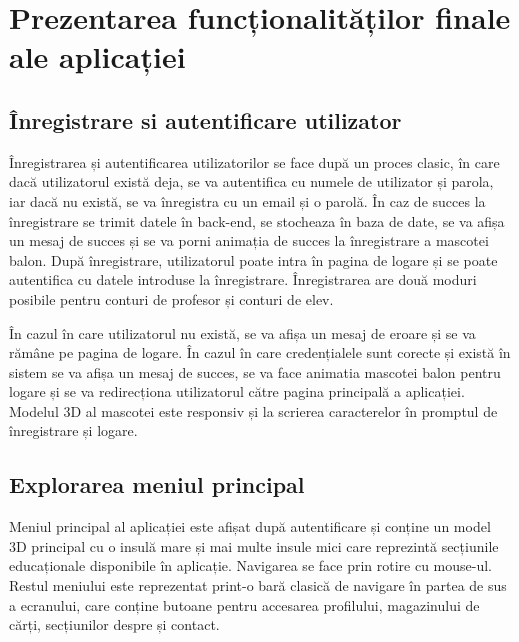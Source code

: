 \chapter{Prezentarea funcționalităților finale ale aplicației}
\label{chapter:scenariiUtilizare}


\section{Înregistrare si autentificare utilizator}
\label{sec:inregistrare-utilizator}


Înregistrarea și autentificarea utilizatorilor se face după un proces clasic, în care dacă utilizatorul există deja,
se va autentifica cu numele de utilizator și parola, iar dacă nu există, se va înregistra cu un email și o parolă.
În caz de succes la înregistrare se trimit datele în back-end, se stocheaza în baza de date, se va afișa un mesaj de succes
și se va porni animația de succes la înregistrare a mascotei balon. După înregistrare, utilizatorul poate intra în 
pagina de logare și se poate autentifica cu datele introduse la înregistrare. Înregistrarea are două moduri posibile
pentru conturi de profesor și conturi de elev.

În cazul în care utilizatorul nu există, se va afișa un mesaj de eroare și se va rămâne pe pagina de logare.
În cazul în care credențialele sunt corecte și există în sistem se va afișa un mesaj de succes,
se va face animatia mascotei balon pentru logare și se va redirecționa utilizatorul către pagina principală a aplicației.
Modelul 3D al mascotei este responsiv și la scrierea caracterelor în promptul de înregistrare și logare.

\section{Explorarea meniul principal}
\label{sec:explorare-meniu-principal}

Meniul principal al aplicației este afișat după autentificare și conține un model 3D principal cu o insulă mare și mai multe insule
mici care reprezintă secțiunile educaționale disponibile în aplicație. Navigarea se face prin rotire cu mouse-ul. Restul meniului 
este reprezentat print-o bară clasică de navigare în partea de sus a ecranului, care conține butoane pentru accesarea profilului,
magazinului de cărți, secțiunilor despre și contact.



